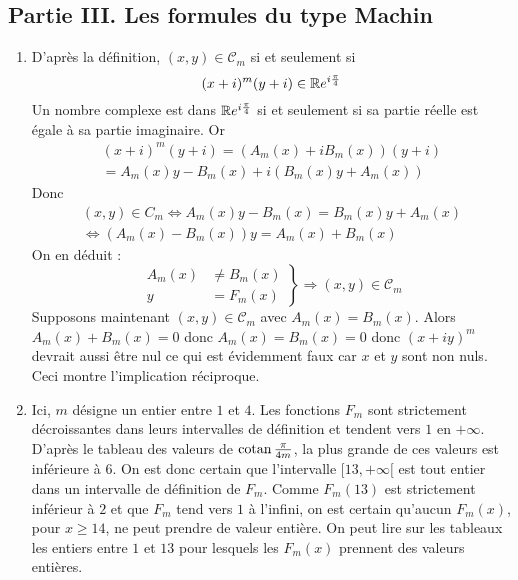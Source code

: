 \subsection*{Partie III. Les formules du type Machin}
\begin{enumerate}
 \item D'après la définition, $(x,y)\in\mathcal C_m$ si et seulement si  
\begin{displaymath}
 (x+i)^m(y+i)\in\mathbb{R} e^{i\frac{\pi}{4}}
\end{displaymath}
Un nombre complexe est dans $\mathbb{R} e^{i\frac{\pi}{4}}$ si et seulement si sa partie réelle est égale à sa partie imaginaire. Or
\begin{multline*}
 (x+i)^m(y+i)=(A_m(x)+iB_m(x))(y+i) \\
 = A_m(x)y-B_m(x)+i(B_m(x)y+A_m(x))
\end{multline*}
Donc
\begin{multline*}
 (x,y)\in C_m \Leftrightarrow A_m(x)y-B_m(x) = B_m(x)y+A_m(x) \\
\Leftrightarrow (A_m(x)-B_m(x))y = A_m(x) + B_m(x)
\end{multline*}
On en déduit :
\begin{displaymath}
 \left.  
\begin{aligned}
 A_m(x) &\neq B_m(x)\\
 y &=F_m(x) 
\end{aligned}
\right\rbrace
\Rightarrow (x,y)\in \mathcal C_m
\end{displaymath}
Supposons maintenant $(x,y)\in \mathcal C_m$ avec $A_m(x) = B_m(x)$. Alors $A_m(x)+B_m(x)=0$ donc $A_m(x)=B_m(x)=0$ donc $(x+iy)^m$  devrait aussi être nul ce qui est évidemment faux car $x$ et $y$ sont non nuls. Ceci montre l'implication réciproque. 
\item Ici, $m$ désigne un entier entre $1$ et $4$.\newline
Les fonctions $F_m$ sont strictement décroissantes dans leurs intervalles de définition et tendent vers $1$ en $+\infty$.\\
D'après le tableau des valeurs de $\operatorname{cotan}\frac{\pi}{4m}$, la plus grande de ces valeurs est inférieure à $6$. On est donc certain que l'intervalle $[13,+\infty[ $ est tout entier dans un intervalle de définition de $F_m$. Comme $F_m(13)$ est strictement inférieur à $2$ et que $F_m$ tend vers $1$ à l'infini, on est certain qu'aucun $F_m(x)$, pour $x\geq 14$, ne peut prendre de valeur entière.\newline
On peut lire sur les tableaux les entiers entre $1$ et $13$ pour lesquels les $F_m(x)$ prennent des valeurs entières.\newline

\end{enumerate}
